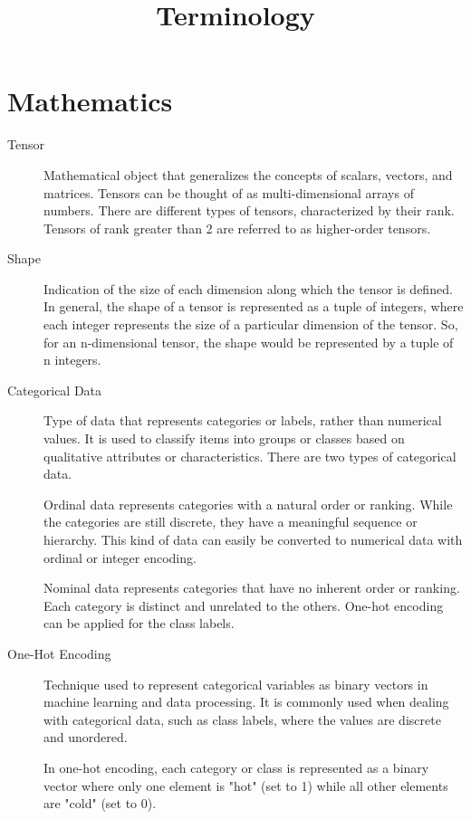 \documentclass[a4paper]{article}
\title{\vspace{-1in}Terminology}
\author{}
\date{}
\begin{document}
\maketitle
\vspace{-0.5in}

\section*{Mathematics}

\begin{description}
\item[Tensor]
Mathematical object that generalizes the concepts of scalars, vectors, and matrices. Tensors can be thought of as multi-dimensional arrays of numbers. There are different types of tensors, characterized by their rank. Tensors of rank greater than 2 are referred to as higher-order tensors. 

\item[Shape]
Indication of the size of each dimension along which the tensor is defined. In general, the shape of a tensor is represented as a tuple of integers, where each integer represents the size of a particular dimension of the tensor. So, for an n-dimensional tensor, the shape would be represented by a tuple of n integers.

\item[Categorical Data]
Type of data that represents categories or labels, rather than numerical values. It is used to classify items into groups or classes based on qualitative attributes or characteristics. There are two types of categorical data.

Ordinal data represents categories with a natural order or ranking. While the categories are still discrete, they have a meaningful sequence or hierarchy. This kind of data can easily be converted to numerical data with ordinal or integer encoding.

Nominal data represents categories that have no inherent order or ranking. Each category is distinct and unrelated to the others. One-hot encoding can be applied for the class labels. 

\item[One-Hot Encoding]
Technique used to represent categorical variables as binary vectors in machine learning and data processing. It is commonly used when dealing with categorical data, such as class labels, where the values are discrete and unordered.

In one-hot encoding, each category or class is represented as a binary vector where only one element is "hot" (set to 1) while all other elements are "cold" (set to 0). 


\end{description}
\end{document}
